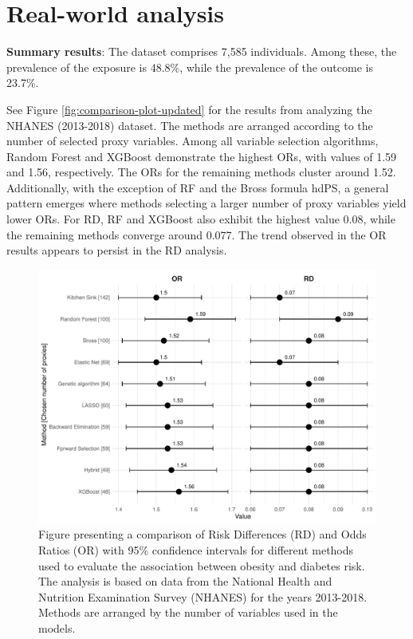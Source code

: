 \documentclass[sn-vancouver,Numbered,lineno,pdflatex]{sn-jnl}
\begin{document}
\section{Real-world analysis}\label{real-world-analysis}

\textbf{Summary results}: The dataset comprises 7,585 individuals. Among
these, the prevalence of the exposure is 48.8\%, while the prevalence of
the outcome is 23.7\%.

See Figure \ref{fig:comparison-plot-updated} for the results from
analyzing the NHANES (2013-2018) dataset. The methods are arranged
according to the number of selected proxy variables. Among all variable
selection algorithms, Random Forest and XGBoost demonstrate the highest
ORs, with values of 1.59 and 1.56, respectively. The ORs for the
remaining methods cluster around 1.52. Additionally, with the exception
of RF and the Bross formula hdPS, a general pattern emerges where
methods selecting a larger number of proxy variables yield lower ORs.
For RD, RF and XGBoost also exhibit the highest value 0.08, while the
remaining methods converge around 0.077. The trend observed in the OR
results appears to persist in the RD analysis.

\begin{figure}[th]

{\centering \includegraphics[width=1\linewidth,]{figures/ORRD} 

}

\caption{Figure presenting a comparison of Risk Differences (RD) and Odds Ratios (OR) with 95\% confidence intervals for different methods used to evaluate the association between obesity and diabetes risk. The analysis is based on data from the National Health and Nutrition Examination Survey (NHANES) for the years 2013-2018. Methods are arranged by the number of variables used in the models.\label{fig:comparison-plot-updated}}\label{fig:unnamed-chunk-3}
\end{figure}
\end{document}
